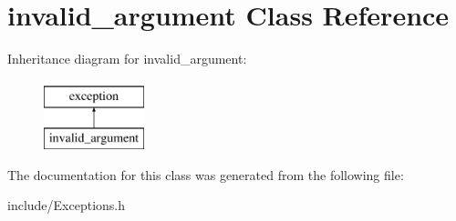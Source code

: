\hypertarget{classinvalid__argument}{}\section{invalid\+\_\+argument Class Reference}
\label{classinvalid__argument}
Inheritance diagram for invalid\+\_\+argument\+:\begin{figure}[H]
\begin{center}
\leavevmode
\includegraphics[height=2.000000cm]{classinvalid__argument}
\end{center}
\end{figure}


The documentation for this class was generated from the following file\+:\begin{DoxyCompactItemize}
\item 
include/Exceptions.\+h\end{DoxyCompactItemize}
